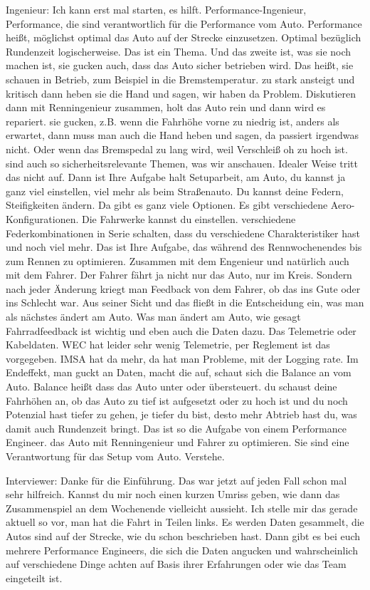 Ingenieur: 
Ich kann erst mal starten, es hilft. Performance-Ingenieur, Performance, die sind verantwortlich für die Performance vom Auto. Performance heißt, möglichst optimal das Auto auf der Strecke einzusetzen. Optimal bezüglich Rundenzeit logischerweise.  Das ist ein Thema. Und das zweite ist, was sie noch machen ist, sie gucken auch, dass das Auto sicher betrieben wird. Das heißt, sie schauen in Betrieb, zum Beispiel in die Bremstemperatur.  zu stark ansteigt und kritisch  dann heben sie die Hand und sagen, wir haben da Problem. Diskutieren dann mit Renningenieur zusammen, holt das Auto rein und dann wird es repariert.  sie gucken, z.B. wenn die Fahrhöhe vorne zu niedrig ist, anders als erwartet, dann muss man auch die Hand heben und sagen, da passiert irgendwas nicht. Oder wenn das Bremspedal zu lang wird, weil Verschleiß oh  zu hoch ist. sind auch so sicherheitsrelevante Themen, was wir anschauen.  Idealer Weise tritt das nicht auf. Dann ist Ihre Aufgabe halt Setuparbeit, am Auto, du kannst ja ganz viel einstellen, viel mehr als beim Straßenauto. Du kannst deine Federn, Steifigkeiten ändern. Da gibt es ganz viele Optionen. Es gibt verschiedene Aero-Konfigurationen. Die Fahrwerke kannst du einstellen.   verschiedene Federkombinationen in Serie schalten, dass du verschiedene Charakteristiker hast und noch viel mehr. Das ist Ihre Aufgabe, das während des Rennwochenendes bis zum Rennen zu optimieren.   Zusammen mit dem Engenieur und natürlich auch mit dem Fahrer. Der Fahrer fährt ja nicht nur das Auto, nur im Kreis. Sondern nach jeder Änderung kriegt man Feedback von dem Fahrer, ob das ins Gute oder ins Schlecht war. Aus seiner Sicht und das fließt in die Entscheidung ein, was man als nächstes ändert am Auto.   Was man ändert am Auto, wie gesagt Fahrradfeedback ist wichtig und eben auch die Daten dazu.  Das Telemetrie oder Kabeldaten. WEC hat leider sehr wenig Telemetrie, per Reglement ist das vorgegeben. IMSA hat da mehr, da hat man Probleme, mit der Logging rate. Im Endeffekt, man guckt an Daten, macht die auf, schaut sich die Balance an vom Auto.  Balance heißt dass das Auto unter oder übersteuert. du schaust deine Fahrhöhen an, ob das Auto zu tief ist aufgesetzt oder zu hoch ist und du noch Potenzial hast tiefer zu gehen, je tiefer du bist, desto mehr Abtrieb hast du, was damit auch Rundenzeit bringt. Das ist so die Aufgabe von einem Performance Engineer. das Auto mit Renningenieur und Fahrer zu optimieren. Sie sind eine Verantwortung für das Setup vom Auto. Verstehe. 

Interviewer: 
Danke für die Einführung. Das war jetzt auf jeden Fall schon mal sehr hilfreich.  Kannst du mir noch einen kurzen Umriss geben, wie dann das Zusammenspiel an dem Wochenende vielleicht aussieht.  Ich stelle mir das gerade aktuell so vor, man hat die Fahrt in Teilen links.  Es werden Daten gesammelt, die Autos sind auf der Strecke, wie du schon beschrieben hast. Dann gibt es bei euch mehrere Performance Engineers, die sich die Daten angucken und wahrscheinlich auf verschiedene Dinge  achten auf Basis ihrer Erfahrungen oder wie das Team eingeteilt ist.   

